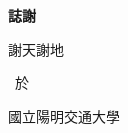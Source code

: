 \thispagestyle{empty}

\begin{center}
\Large
\textbf{誌\hspace{1cm}謝}
\end{center}

\vspace{1cm}
\linespread{2}%
\selectfont
\hspace{0.25cm}

謝天謝地

\vspace{3cm}
\begin{flushright}
\studentCnName \ 於

國立陽明交通大學\ \NameofDepartmentInstituteCN

\ThesisDateTW
\end{flushright}